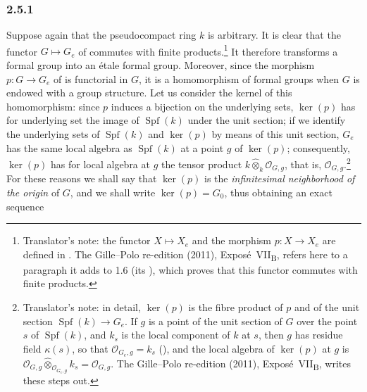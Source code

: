 
\subsubsection*{2.5.1}
\label{sga3:VIIB:2.5.1}

Suppose again that the pseudocompact ring \(k\) is arbitrary. It is
clear that the functor \(G\mapsto G_e\) of  commutes with
finite products.\footnote{Translator's note: the functor \(X\mapsto X_e\) and the morphism
\(p\colon X\to X_e\) are defined in . The Gille--Polo re-edition (2011),
Expos\'e~VII\textsubscript{B}, refers here to a paragraph it adds to 1.6 (its ), which
proves that this functor commutes with finite products.} It therefore transforms a formal group into an étale
formal group. Moreover, since the morphism \(p:G\to G_e\) of
 is functorial in \(G\), it is a homomorphism of formal groups
when \(G\) is endowed with a group structure. Let us consider the
kernel of this homomorphism: since \(p\) induces a bijection on the
underlying sets, \(\ker(p)\) has for underlying set the image of
\(\operatorname{Spf}(k)\) under the unit section; if we identify the
underlying sets of \(\operatorname{Spf}(k)\) and \(\ker(p)\) by means of
this unit section, \(G_e\) has the same local algebra as
\(\operatorname{Spf}(k)\) at a point \(g\) of \(\ker(p)\); consequently,
\(\ker(p)\) has for local algebra at \(g\) the tensor product
\(k\widehat\otimes_k\mathcal O_{G,g}\), that is,
\(\mathcal O_{G,g}\).\footnote{Translator's note: in detail, \(\ker(p)\) is the fibre product of
\(p\) and of the unit section \(\operatorname{Spf}(k)\to G_e\). If \(g\) is a point of the unit section of
\(G\) over the point \(s\) of \(\operatorname{Spf}(k)\), and \(k_s\) is the local component of \(k\) at
\(s\), then \(g\) has residue field \(\kappa(s)\), so that \(\mathcal O_{G_e,g}=k_s\) (), and
the local algebra of \(\ker(p)\) at \(g\) is
\(\mathcal O_{G,g}\widehat\otimes_{\mathcal O_{G_e,g}}k_s=\mathcal O_{G,g}\). The Gille--Polo re-edition
(2011), Expos\'e~VII\textsubscript{B}, writes these steps out.} For these reasons we shall say that \(\ker(p)\)
is the \emph{infinitesimal neighborhood of the origin} of \(G\), and we
shall write \(\ker(p)=G_0\), thus obtaining an exact sequence
\begin{center}
  \label{sga3:VIIB:2.5.1:infinitesimal-exact-sequence}
  
\end{center}

